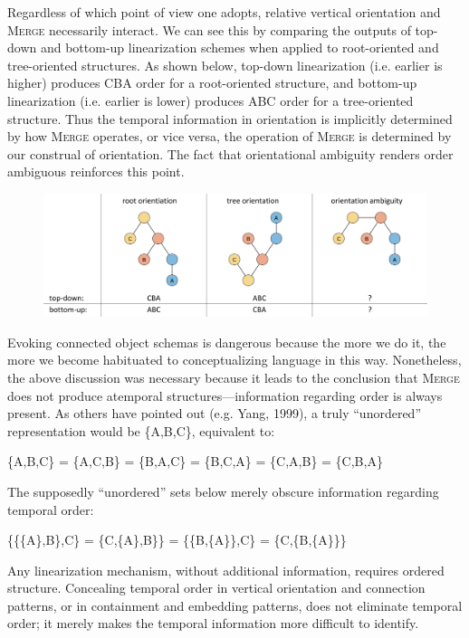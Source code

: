   Regardless of which point of view one adopts, relative vertical orientation and \textsc{Merge} necessarily interact. We can see this by comparing the outputs of top-down and bottom-up linearization schemes when applied to root-oriented and tree-oriented structures. As shown below, top-down linearization (i.e. earlier is higher) produces CBA order for a root-oriented structure, and bottom-up linearization (i.e. earlier is lower) produces ABC order for a tree-oriented structure. Thus the temporal information in orientation is implicitly determined by how \textsc{Merge} operates, or vice versa, the operation of \textsc{Merge} is determined by our construal of orientation. The fact that orientational ambiguity renders order ambiguous reinforces this point.

  
\begin{figure}
\includegraphics[width=\textwidth]{figures/Tilsen-img44.png}
\caption{\missingcaption}
\label{fig:}
\end{figure}
 

  Evoking connected object schemas is dangerous because the more we do it, the more we become habituated to conceptualizing language in this way. Nonetheless, the above discussion was necessary because it leads to the conclusion that \textsc{Merge} does not produce atemporal structures—information regarding order is always present. As others have pointed out (e.g. Yang, 1999), a truly “unordered” representation would be \{A,B,C\}, equivalent to:

  \{A,B,C\} = \{A,C,B\} = \{B,A,C\} = \{B,C,A\} = \{C,A,B\} = \{C,B,A\}

The supposedly “unordered” sets below merely obscure information regarding temporal order:

  \{\{\{A\},B\},C\} = \{C,\{A\},B\}\} = \{\{B,\{A\}\},C\} = \{C,\{B,\{A\}\}\}

Any linearization mechanism, without additional information, requires ordered structure. Concealing temporal order in vertical orientation and connection patterns, or in containment and embedding patterns, does not eliminate temporal order; it merely makes the temporal information more difficult to identify. 

